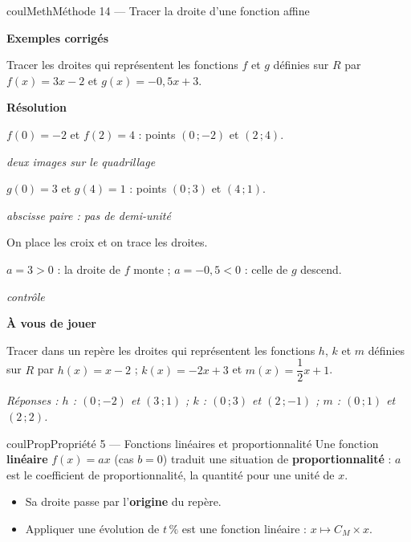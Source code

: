 \documentclass[11pt,a4paper]{article}
\makeatletter
\newcommand{\R}{\mathbb{R}}
\newcommand{\N}{\mathbb{N}}
\newcommand{\Z}{\mathbb{Z}}
\newcommand{\Q}{\mathbb{Q}}
\newcommand{\vect}[1]{\overrightarrow{#1}}
\newcommand{\fois}[1]{\times{\color{coulExo}#1}}
\providecommand{\Cf}{\mathcal{C}\sb{f}}%
\providecommand{\Cg}{\mathcal{C}\sb{g}}%
\newcounter{lycee@signet}
\newcommand{\signet}[3][]{\stepcounter{lycee@signet}%
  \edef\lycee@dest{\if\relax\detokenize{#1}\relax
    signet.\arabic{lycee@signet}\else#1\fi}%
  \hypertarget{\lycee@dest}{}\bookmark[level=#2,dest=\lycee@dest]{#3}}
\def\R{R}\def\N{N}\def\Z{Z}\def\Q{Q}\def\vect#1{#1}\def\Cf{Cf}\def\Cg{Cg}\def\fois#1{×#1}%
\newcounter{methode}
\newenvironment{proprietebox}[1][Propriété]%
  {\begin{boitecours}[phantom={\signet{2}{#1}}]{coulProp}{#1}}{\end{boitecours}}
\newenvironment{methodebox}[1][Méthode]{\stepcounter{methode}%
  \begin{boitecours}[phantom={\signet[methode-\arabic{methode}]{2}{#1}}]{coulMeth}{#1}}%
  {\end{boitecours}}
\newcommand{\etape}[1]{\par\smallskip\textbf{\color{coulMeth}#1}\par\nobreak\smallskip}
\newcommand{\reponse}[1]{\par\smallskip
  {\footnotesize\itshape\color{black!55}Réponses : #1}}
\newcommand{\explique}[2]{\par\smallskip\noindent
  \begin{minipage}[t]{0.57\linewidth}\raggedright #1\end{minipage}\hfill
  \begin{minipage}[t]{0.40\linewidth}\raggedright\leavevmode
    {\small\itshape\color{black!60}#2}\end{minipage}\par}
\newcommand{\cas}[1]{\par\smallskip\noindent\textbf{\color{coulExo}#1}\vadjust{\nobreak}}
\newenvironment{correction}{\par}{\par}
\newcommand{\etapeexemples}{\etape{Exemples corrigés}}
\makeatother
\begin{document}
\begin{methodebox}[Méthode 14 --- Tracer la droite d'une fonction affine]
\etapeexemples
Tracer les droites qui représentent les fonctions $f$ et $g$ définies sur $\R$ par
$f(x)=3x-2$ et $g(x)=-0{,}5x+3$.
\begin{correction}
\cas{Résolution}\par\nopagebreak
\noindent
\begin{minipage}[c]{0.58\linewidth}\raggedright
\explique{$f(0)=-2$ et $f(2)=4$ : points $(0\,;-2)$ et $(2\,;4)$.}{deux images
sur le quadrillage}
\explique{$g(0)=3$ et $g(4)=1$ : points $(0\,;3)$ et $(4\,;1)$.}{abscisse paire : pas
de demi-unité}
\explique{On place les croix et on trace les droites.}{}
\explique{$a=3>0$ : la droite de $f$ monte ; $a=-0{,}5<0$ : celle de $g$
descend.}{contrôle}
\end{minipage}\hfill
\begin{minipage}[c]{0.38\linewidth}\centering
{}
\end{minipage}
\end{correction}

\etape{À vous de jouer}
Tracer dans un repère les droites qui représentent les fonctions $h$, $k$ et $m$ définies
sur $\R$ par $h(x)=x-2$ ; $k(x)=-2x+3$ et $m(x)=\dfrac{1}{2}x+1$.
\reponse{$h$ : $(0\,;-2)$ et $(3\,;1)$ ;\; $k$ : $(0\,;3)$ et $(2\,;-1)$ ;\; $m$ :
$(0\,;1)$ et $(2\,;2)$.}
\end{methodebox}

\begin{proprietebox}[Propriété 5 --- Fonctions linéaires et proportionnalité]
Une fonction \textbf{linéaire} $f(x)=ax$ (cas $b=0$) traduit une situation de
\textbf{proportionnalité} : $a$ est le coefficient de proportionnalité, la quantité
pour une unité de $x$.
\begin{itemize}
  \item Sa droite passe par l'\textbf{origine} du repère.
  \item Appliquer une évolution de $t\,\%$ est une fonction linéaire :
        $x\mapsto C_{M}\times x$.
\end{itemize}
\end{proprietebox}
\end{document}
